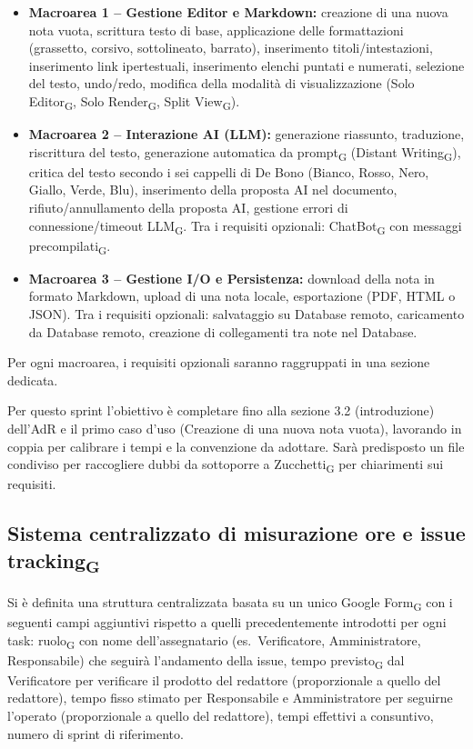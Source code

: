 \begin{itemize}
	\item \textbf{Macroarea 1 -- Gestione Editor e Markdown:} creazione di una nuova nota vuota, scrittura testo di base, applicazione delle formattazioni (grassetto, corsivo, sottolineato, barrato), inserimento titoli/intestazioni, inserimento link ipertestuali, inserimento elenchi puntati e numerati, selezione del testo, undo/redo, modifica della modalità di visualizzazione (Solo Editor\textsubscript{G}, Solo Render\textsubscript{G}, Split View\textsubscript{G}).
	\item \textbf{Macroarea 2 -- Interazione AI (LLM):} generazione riassunto, traduzione, riscrittura del testo, generazione automatica da prompt\textsubscript{G} (Distant Writing\textsubscript{G}), critica del testo secondo i sei cappelli di De Bono (Bianco, Rosso, Nero, Giallo, Verde, Blu), inserimento della proposta AI nel documento, rifiuto/annullamento della proposta AI, gestione errori di connessione/timeout LLM\textsubscript{G}. Tra i requisiti opzionali: ChatBot\textsubscript{G} con messaggi precompilati\textsubscript{G}.
	\item \textbf{Macroarea 3 -- Gestione I/O e Persistenza:} download della nota in formato Markdown, upload di una nota locale, esportazione (PDF, HTML o JSON). Tra i requisiti opzionali: salvataggio su Database remoto, caricamento da Database remoto, creazione di collegamenti tra note nel Database.
\end{itemize}
 
Per ogni macroarea, i requisiti opzionali saranno raggruppati in una sezione dedicata. 

Per questo sprint l'obiettivo è completare fino alla sezione 3.2 (introduzione) dell'AdR e il primo caso d'uso (Creazione di una nuova nota vuota), lavorando in coppia per calibrare i tempi e la convenzione da adottare. Sarà predisposto un file condiviso per raccogliere dubbi da sottoporre a Zucchetti\textsubscript{G} per chiarimenti sui requisiti.
 
\subsection{Sistema centralizzato di misurazione ore e issue tracking\textsubscript{G}}
Si è definita una struttura centralizzata basata su un unico Google Form\textsubscript{G} con i seguenti campi aggiuntivi rispetto a quelli precedentemente introdotti per ogni task: ruolo\textsubscript{G} con nome dell'assegnatario (es.\ Verificatore, Amministratore, Responsabile) che seguirà l'andamento della issue, tempo previsto\textsubscript{G} dal Verificatore per verificare il prodotto del redattore (proporzionale a quello del redattore), tempo fisso stimato per Responsabile e Amministratore per seguirne l'operato (proporzionale a quello del redattore), tempi effettivi a consuntivo, numero di sprint di riferimento.

